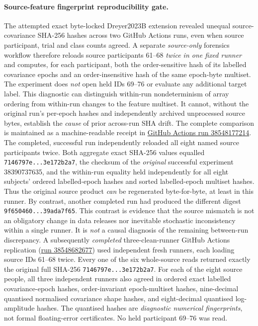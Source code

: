 \paragraph{Source-feature fingerprint reproducibility gate.}
The attempted exact byte-locked Dreyer2023B
extension revealed unequal source-covariance SHA-256
hashes across two GitHub Actions runs, even when
source participant, trial and class counts agreed.
A separate \emph{source-only} forensics workflow
therefore reloads source participants 61--68
\emph{twice in one fixed runner} and computes,
for each participant, both the
order-sensitive hash of its labelled covariance
epochs and an order-insensitive hash of the
same epoch-byte multiset.
The experiment does \emph{not} open held IDs
69--76 or evaluate any additional target label.
This diagnostic can distinguish within-run
nondeterminism of array ordering from
within-run changes to the feature multiset.
It cannot, without the original run's
per-epoch hashes and independently archived
unprocessed source bytes, establish the
\emph{cause} of prior across-run SHA drift.
The complete comparison is maintained as a
machine-readable receipt in
\href{https://github.com/lindicaphxag-tech/kaggle/actions/runs/38548177214}
{GitHub Actions run 38548177214}.
The completed, successful run independently reloaded
all eight named source participants twice. Both
aggregate exact SHA-256 values equalled
\texttt{7146797e...3e172b2a7}, the checksum
of the \emph{original} successful experiment
38390737635, and the within-run equality
held independently for all eight subjects'
ordered labelled-epoch hashes and sorted
labelled-epoch multiset hashes. Thus the
original source product \emph{can} be regenerated
byte-for-byte, at least in this runner.
By contrast, another completed run had produced
the different digest
\texttt{9f650460...39ada7f65}.
This contrast is evidence that the source mismatch
is not an obligatory change in data releases nor
inevitable stochastic inconsistency within a single
runner. It is \emph{not} a causal diagnosis of the
remaining between-run discrepancy.
A subsequently \emph{completed} three-clean-runner
GitHub Actions replication
(\href{https://github.com/lindicaphxag-tech/kaggle/actions/runs/38548682677}
{run 38548682677}) used independent fresh
runners, each loading source IDs 61--68 twice.
Every one of the six whole-source
reads returned exactly the original full
SHA-256 \texttt{7146797e...3e172b2a7}.
For each of the eight source people, all
three independent runners also agreed in
ordered exact labelled covariance-epoch hashes,
order-invariant epoch-multiset hashes,
nine-decimal quantised normalised covariance
shape hashes, and eight-decimal quantised
log-amplitude hashes. The quantised hashes
are \emph{diagnostic numerical fingerprints},
not formal floating-error certificates.
No held participant 69--76 was read.

